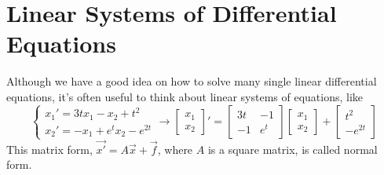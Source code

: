 \chapter{Linear Systems of Differential Equations}
Although we have a good idea on how to solve many single linear differential equations, it's often useful to think about linear systems of equations, like
\begin{equation*}
	\begin{cases}
		x_1' = 3tx_1 - x_2 + t^2 \\
		x_2' = -x_1 + e^tx_2 - e^{2t}
	\end{cases}
	\to
	\begin{bmatrix}
		x_1 \\ 
		x_2
	\end{bmatrix}' = \begin{bmatrix}
		3t & -1 \\
		-1 & e^t
	\end{bmatrix} \begin{bmatrix}
		x_1 \\
		x_2
	\end{bmatrix} + \begin{bmatrix}
		t^2 \\
		-e^{2t}
	\end{bmatrix}
\end{equation*}
This matrix form, $\vec{x'} = A\vec{x} + \vec{f}$, where $A$ is a square matrix, is called normal form.\\





